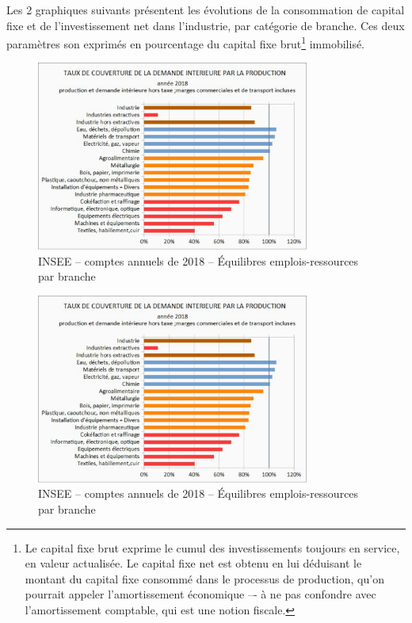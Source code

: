 \documentclass[a4paper]{article}
\begin{document}
Les 2 graphiques suivants présentent les évolutions de la consommation de capital fixe et de l’investissement net dans l’industrie, par catégorie de branche. Ces deux paramètres son exprimés en pourcentage du capital fixe brut\footnote{Le capital  fixe brut exprime le cumul des investissements toujours en service, en valeur actualisée. Le capital fixe net est obtenu en lui déduisant le montant du capital fixe consommé dans le processus de production, qu’on pourrait appeler l’amortissement économique –- à ne pas confondre avec l’amortissement comptable, qui est une notion fiscale.} immobilisé. 

\begin{figure}[H]
    \centering
    \includegraphics*[width=0.8\textwidth]{images/couverture}
    \caption{INSEE – comptes annuels de 2018 – Équilibres emplois-ressources par branche}
    \label{fig:couverture}
\end{figure}

\begin{figure}[H]
    \centering
    \includegraphics*[width=0.8\textwidth]{images/couverture}
    \caption{INSEE – comptes annuels de 2018 – Équilibres emplois-ressources par branche}
    \label{fig:couverture}
\end{figure}
\end{document}
